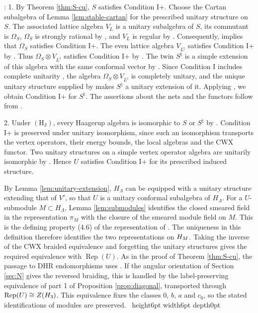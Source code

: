 \documentclass[leqno]{article}
\let\cal\relax
\newcommand{\cal}{\mathcal}
\newcommand{\qed}{\hfill \vrule height6pt  width6pt depth0pt}
\newcommand{\ot}{\otimes}
\DeclareMathOperator{\Rep}{Rep} %
\newenvironment{proof}[1][]{\noindent {\it Proof #1} : }{\hbox{~}\qed
\smallskip
}
\numberwithin{equation}{section}
\begin{document}
\begin{proof}
1. By Theorem \ref{thm:S-cu}, $S$ satisfies Condition I+. Choose the Cartan subalgebra of Lemma \ref{lem:stable-cartan} for the prescribed unitary structure on $S$. The associated lattice algebra $V_L$ is a unitary subalgebra of $S$, its commutant is $\Omega_S$, $\Omega_S$ is strongly rational by \cite[Proposition 12.2]{Arh26}, and $V_L$ is regular by \cite[Corollary 3.32 p.~49]{Gui22}. Consequently, \cite[Theorem 6.18(3) p.~70]{Gui25} implies that $\Omega_S$ satisfies Condition I+. The even lattice algebra $V_{L^\natural}$ satisfies Condition I+ by \cite[Example 6.19(b) p.~71]{Gui25}. Thus $\Omega_S \ot V_{L^\natural}$ satisfies Condition I+ by \cite[Theorem 6.18(1) p.~70]{Gui25}. The twin $S^\natural$ is a simple extension of this algebra with the same conformal vector by \cite[Theorem 12.3]{Arh26}. Since Condition I includes complete unitarity \cite[Definition 4.15 p.~41]{Gui25}, the algebra $\Omega_S \ot V_{L^\natural}$ is completely unitary, and the unique unitary structure supplied by \cite[Theorem 4.7 p.~19]{CGGH23} makes $S^\natural$ a unitary extension of it. Applying \cite[Theorem 6.18(2) p.~70]{Gui25}, we obtain Condition I+ for $S^\natural$. The assertions about the nets and the functors follow from \cite[(0.3) p.~8, Remark 4.16 p.~41, Theorem 6.14 pp.~68--69 and Definition 6.17 p.~70]{Gui25}.

2. Under $\mathrm{(H_J)}$, every Haagerup algebra is isomorphic to $S$ or $S^\natural$ by \cite[Theorem 12.4]{Arh26}. Condition I+ is preserved under unitary isomorphism, since such an isomorphism transports the vertex operators, their energy bounds, the local algebras and the CWX functor. Two unitary structures on a simple vertex operator algebra are unitarily isomorphic by \cite[Proposition 5.19 pp.~40--41]{CKLW18}. Hence $U$ satisfies Condition I+ for its prescribed induced structure.

By Lemma \ref{lem:unitary-extension}, $H_\Lambda$ can be equipped with a unitary structure extending that of $V'$, so that $U$ is a unitary conformal subalgebra of $H_\Lambda$. For a $U$-submodule $M \subset H_\Lambda$, Lemma \ref{lem:submodules} identifies the closed smeared field in the representation $\pi_M$ with the closure of the smeared module field on $M$. This is the defining property (4.6) of the representation of \cite[Definition 4.22 p.~43]{Gui25}. The uniqueness in this definition therefore identifies the two representations on $\cal H_M$. Taking the inverse of the CWX braided equivalence and forgetting the unitary structures gives the required equivalence with $\Rep(U)$. As in the proof of Theorem \ref{thm:S-cu}, the passage to DHR endomorphisms uses \cite[Theorem 6.6 p.~77]{Gui21a}. If the angular orientation of Section \ref{sec:N} gives the reversed braiding, this is handled by the label-preserving equivalence of part 1 of Proposition \ref{prop:diagonal}, transported through $\Rep(U) \cong Z(\cal H_3)$. This equivalence fixes the classes $0$, $b$, $a$ and $c_0$, so the stated identifications of modules are preserved.
\end{proof}
\end{document}
